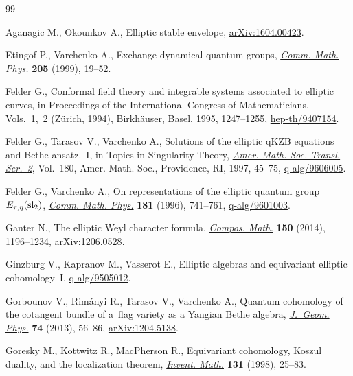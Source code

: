 \documentclass[10pt,a4paper]{amsart}
\numberwithin{equation}{section}
\begin{document}

\begin{thebibliography}{99}
\footnotesize\itemsep=0.5pt

Aganagic M., Okounkov A., Elliptic stable envelope, \href{https://arxiv.org/abs/1604.00423}{arXiv:1604.00423}.

Etingof P., Varchenko A., Exchange dynamical quantum groups, \href{https://doi.org/10.1007/s002200050665}{\textit{Comm.
 Math. Phys.}} \textbf{205} (1999), 19--52.

Felder G., Conformal field theory and integrable systems associated to elliptic
 curves, in Proceedings of the {I}nternational {C}ongress of {M}athematicians,
 {V}ols.~1,~2 ({Z}\"{u}rich, 1994), Birkh\"{a}user, Basel, 1995, 1247--1255,
 \href{https://arxiv.org/abs/hep-th/9407154}{hep-th/9407154}.

Felder G., Tarasov V., Varchenko A., Solutions of the elliptic q{KZB} equations
 and {B}ethe ansatz.~{I}, in Topics in Singularity Theory, \href{https://doi.org/10.1090/trans2/180/04}{\textit{Amer. Math.
 Soc. Transl. Ser.~2}}, Vol.~180, Amer. Math. Soc., Providence, RI, 1997,
 45--75, \href{https://arxiv.org/abs/q-alg/9606005}{q-alg/9606005}.

Felder G., Varchenko A., On representations of the elliptic quantum group
 {$E_{\tau,\eta}({\rm sl}_2)$}, \href{https://doi.org/10.1007/BF02101296}{\textit{Comm. Math. Phys.}} \textbf{181}
 (1996), 741--761, \href{https://arxiv.org/abs/q-alg/9601003}{q-alg/9601003}.

Ganter N., The elliptic {W}eyl character formula, \href{https://doi.org/10.1112/S0010437X1300777X}{\textit{Compos. Math.}}
 \textbf{150} (2014), 1196--1234, \href{https://arxiv.org/abs/1206.0528}{arXiv:1206.0528}.

Ginzburg V., Kapranov M., Vasserot E., Elliptic algebras and equivariant
 elliptic cohomology~{I}, \mbox{\href{https://arxiv.org/abs/q-alg/9505012}{q-alg/9505012}}.

Gorbounov V., Rim\'{a}nyi R., Tarasov V., Varchenko A., Quantum cohomology of
 the cotangent bundle of a~flag variety as a {Y}angian {B}ethe algebra,
 \href{https://doi.org/10.1016/j.geomphys.2013.07.006}{\textit{J.~Geom. Phys.}} \textbf{74} (2013), 56--86, \href{https://arxiv.org/abs/1204.5138}{arXiv:1204.5138}.

Goresky M., Kottwitz R., MacPherson R., Equivariant cohomology, {K}oszul
 duality, and the localization theorem, \href{https://doi.org/10.1007/s002220050197}{\textit{Invent. Math.}} \textbf{131}
 (1998), 25--83.


\end{thebibliography}
\end{document}
